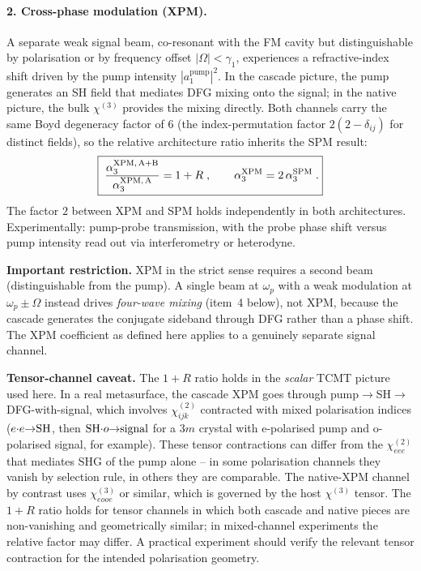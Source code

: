 \documentclass[11pt,a4paper]{article}
\newcommand{\chitwo}{\chi^{(2)}}
\newcommand{\chithree}{\chi^{(3)}}
\begin{document}
\paragraph{2. Cross-phase modulation (XPM).}
A separate weak signal beam, co-resonant with the FM cavity but
distinguishable by polarisation or by frequency offset
$|\Omega|<\gamma_1$, experiences a refractive-index shift driven by
the pump intensity $|a_1^\text{pump}|^{2}$.  In the cascade picture,
the pump generates an SH field that mediates DFG mixing onto the
signal; in the native picture, the bulk $\chithree$ provides the
mixing directly.  Both channels carry the same Boyd degeneracy factor
of $6$ (the index-permutation factor $2(2-\delta_{ij})$ for distinct
fields), so the relative architecture ratio inherits the SPM result:
\begin{equation}
  \boxed{\;\frac{\alpha_3^\text{XPM,\,A+B}}{\alpha_3^\text{XPM,\,A}}=1+R\;,\qquad
          \alpha_3^\text{XPM}=2\,\alpha_3^\text{SPM}\;.}
\end{equation}
The factor $2$ between XPM and SPM holds independently in both
architectures.  Experimentally: pump-probe transmission, with the
probe phase shift versus pump intensity read out via interferometry or
heterodyne.

\textbf{Important restriction.}  XPM in the strict sense requires a
second beam (distinguishable from the pump).  A single beam at
$\omega_p$ with a weak modulation at $\omega_p\pm\Omega$ instead drives
\emph{four-wave mixing} (item~4 below), not XPM, because the cascade
generates the conjugate sideband through DFG rather than a phase
shift.  The XPM coefficient as defined here applies to a genuinely
separate signal channel.

\textbf{Tensor-channel caveat.}  The $1+R$ ratio holds in the
\emph{scalar} TCMT picture used here.  In a real metasurface, the
cascade XPM goes through pump${\to}$SH${\to}$DFG-with-signal, which
involves $\chitwo_{ijk}$ contracted with mixed polarisation indices
($e{\cdot}e{\to}{\rm SH}$, then ${\rm SH}{\cdot}o{\to}{\rm signal}$ for
a $3m$ crystal with e-polarised pump and o-polarised signal, for
example).  These tensor contractions can differ from the
$\chitwo_{eee}$ that mediates SHG of the pump alone -- in some
polarisation channels they vanish by selection rule, in others they
are comparable.  The native-XPM channel by contrast uses
$\chithree_{eooe}$ or similar, which is governed by the host
$\chithree$ tensor.  The $1+R$ ratio holds for tensor channels in
which both cascade and native pieces are non-vanishing and
geometrically similar; in mixed-channel experiments the relative
factor may differ.  A practical experiment should verify the relevant
tensor contraction for the intended polarisation geometry.
\end{document}
